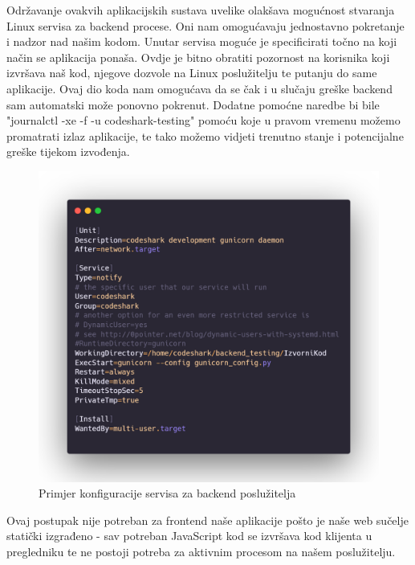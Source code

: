			\noindent Održavanje ovakvih aplikacijskih sustava uvelike olakšava mogućnost stvaranja Linux servisa za backend procese. Oni nam omogućavaju jednostavno pokretanje i nadzor nad našim kodom.
			Unutar servisa moguće je specificirati točno na koji način se aplikacija ponaša. Ovdje je bitno obratiti pozornost na korisnika koji izvršava naš kod, njegove dozvole na Linux poslužitelju te putanju do same aplikacije.
			Ovaj dio koda nam omogućava da se čak i u slučaju greške backend sam automatski može ponovno pokrenut. Dodatne pomoćne naredbe bi bile "journalctl -xe -f -u codeshark-testing" pomoću koje u pravom vremenu možemo promatrati izlaz aplikacije, te tako možemo vidjeti trenutno stanje i potencijalne greške tijekom izvođenja.
			
			\begin{figure}[H]
				\includegraphics[width=\textwidth]{slike/backendServis.png} %
				\caption{Primjer konfiguracije servisa za backend poslužitelja}
				\label{fig:DijagramRazmještaja} %
			\end{figure}
			
			Ovaj postupak nije potreban za frontend naše aplikacije pošto je naše web sučelje statički izgrađeno - sav potreban JavaScript kod se izvršava kod klijenta u pregledniku te ne postoji potreba za aktivnim procesom na našem poslužitelju.
			
			\eject
			
			
			\eject 